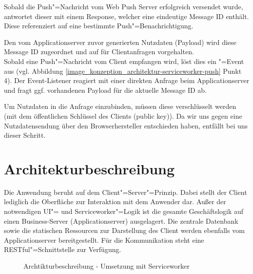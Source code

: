 Sobald die Push"=Nachricht vom Web Push Server erfolgreich versendet wurde, antwortet dieser mit einem Response, welcher eine eindeutige Message ID enthält. Diese referenziert auf eine bestimmte Push"=Benachrichtigung.

Den vom Applicationserver zuvor generierten Nutzdaten (Payload) wird diese Message ID zugeordnet und auf für Clientanfragen vorgehalten. \\
Sobald eine Push"=Nachricht vom Client empfangen wird, löst dies ein "=Event aus (vgl. Abbildung \ref{image_konzeption_architektur-serviceworker-push} Punkt 4). Der Event-Listener reagiert mit einer direkten Anfrage beim Applicationserver und fragt ggf. vorhandenen Payload für die aktuelle Message ID ab.

Um Nutzdaten in die Anfrage einzubinden, müssen diese verschlüsselt werden (mit dem öffentlichen Schlüssel des Clients (public key)).
Da wir uns gegen eine Nutzdatensendung über den Browserhersteller entschieden haben, entfällt bei uns dieser Schritt. 

\newpage
\section{Architekturbeschreibung}
\label{sec_konzeption_serviceworker_architektur}

Die Anwendung beruht auf dem Client"=Server"=Prinzip. Dabei stellt der Client lediglich die Oberfläche zur Interaktion mit dem Anwender dar. Außer der notwendigen UI"= und Serviceworker"=Logik ist die gesamte Geschäftslogik auf einen Business-Server (Applicationserver) ausgelagert. Die zentrale Datenbank sowie die statischen Ressourcen zur Darstellung des Client werden ebenfalls vom Applicationserver bereitgestellt. Für die Kommunikation steht eine RESTful"=Schnittstelle zur Verfügung.

\begin{figure}[htp] 
\caption{Archtikturbeschreibung - Umsetzung mit Serviceworker}
\label{image_architektur-serviceworker-push}
\end{figure} 

